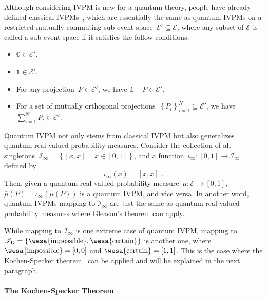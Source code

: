 \documentclass[english,reprint, aps, prl,superscriptaddress, showpacs,
showkeys, longbibliography, amsmath, amssymb]{revtex4-1}
\theoremstyle{plain}
\theoremstyle{definition}
\newcommand{\events}{\ensuremath{\mathcal{E}}}
\newcommand{\imposs}{{\text{\wesa{impossible}}}}
\newcommand{\necess}{{\text{\wesa{certain}}}}
\newcommand{\set}[2]{\ensuremath{\left\{ {#1}~\middle|~{#2}\right\} }}
\begin{document}
Although considering IVPM is new for a quantum theory, people have
already defined classical IVPMs~\cite{JamisonLodwick2004}, which
are essentially the same as quantum IVPMs on a restricted mutually
commuting sub-event space~$\events'\subseteq\events$, where any
subset of $\events$ is called a sub-event space if it satisfies the
follow conditions. 
\begin{itemize}
\item $\mathbb{0}\in\events'$. 
\item $\mathbb{1}\in\events'$. 
\item For any projection~$P\in\events'$, we have $\mathbb{1}-P\in\events'$. 
\item For a set of mutually orthogonal projections~$\left\{ P_{i}\right\} _{i=1}^{N}\subseteq\events'$,
we have $\sum_{i=1}^{N}P_{i}\in\events'$. 
\end{itemize}
Quantum IVPM not only stems from classical IVPM but also generalizes
quantum real-valued probability measures. Consider the collection
of all singletons~$\mathscr{I}_{\infty}=\set{\left[x,x\right]}{x\in\left[0,1\right]}$,
and a function~$\iota_{\infty}:\left[0,1\right]\rightarrow\mathscr{I}_{\infty}$
defined by 
\begin{equation}
\iota_{\infty}\left(x\right)=\left[x,x\right]\textrm{ .}\label{eq:iota_infty}
\end{equation}
Then, given a quantum real-valued probability measure~$\mu:\events\rightarrow\left[0,1\right]$,
$\bar{\mu}(P)=\iota_{\infty}\left(\mu(P)\right)$ is a quantum IVPM,
and vice versa. In another word, quantum IVPMs mapping to $\mathscr{I}_{\infty}$
are just the same as quantum real-valued probability measures where
Gleason's theorem can apply.

While mapping to $\mathscr{I}_{\infty}$ is one extreme case of quantum
IVPM, mapping to $\mathscr{I}_{\mathrm{D}}=\left\{ \imposs,\necess\right\} $
is another one, where $\imposs=\left[0,0\right]$ and $\necess=\left[1,1\right]$.
This is the case where the Kochen-Specker theorem~\cite{kochenspecker1967,peres1995quantum,Redhead1987-REDINA}
can be applied and will be explained in the next paragraph.

\paragraph{The Kochen-Specker Theorem}
\end{document}
